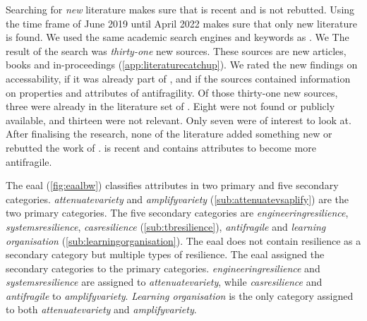 Searching for \textit{new} literature makes sure that \textcite{Botjes2021} is recent and is not rebutted. Using the time frame of June 2019 until April 2022 makes sure that only new literature is found. We used the same academic search engines and keywords as \textcite[p.~5]{Botjes2021}. We The result of the search was \textit{thirty-one} new sources. These sources are new articles, books and in-proceedings (\cref{app:literaturecatchup}). We rated the new findings on accessability, if it was already part of \textcite{Botjes2021}, and if the sources contained information on properties and attributes of \gls{antifragility}. Of those thirty-one new sources, three were already in the literature set of \textcite{Botjes2021}. Eight were not found or publicly available, and thirteen were not relevant. Only seven were of interest to look at. After finalising the research, none of the literature added something new or rebutted the work of \citeauthor{Botjes2021}. \textcite{Botjes2021} is recent and contains \glspl{attribute} to become more \gls{antifragile}.

The \acrlong{eaal} (\cref{fig:eaalbw}) classifies \glspl{attribute} in two primary and five secondary categories. \textit{\Gls{attenuatevariety}} and \textit{\gls{amplifyvariety}} (\cref{sub:attenuatevsaplify}) are the two primary categories. The five secondary categories are \textit{\gls{engineeringresilience}}, \textit{\gls{systemsresilience}}, \textit{\gls{casresilience}} (\cref{sub:tbresilience}), \textit{\gls{antifragile}} and \textit{learning organisation} (\cref{sub:learningorganisation}). The \acrlong{eaal} does not contain resilience as a secondary category but multiple types of resilience. The \acrlong{eaal} assigned the secondary categories to the primary categories. \textit{\Gls{engineeringresilience}} and \textit{\gls{systemsresilience}} are assigned to \textit{\gls{attenuatevariety}}, while \textit{\gls{casresilience}} and \textit{\gls{antifragile}} to \textit{\gls{amplifyvariety}}. \textit{Learning organisation} is the only category assigned to both \textit{\gls{attenuatevariety}} and \textit{\gls{amplifyvariety}}.
